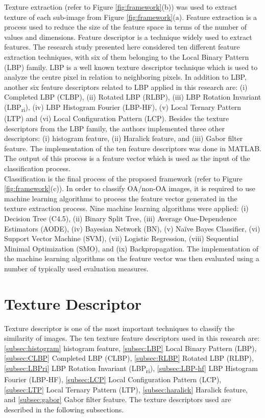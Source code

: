 \documentclass[review]{elsarticle}
\begin{document}
Texture extraction (refer to Figure \ref{fig:framework}(b)) was used to extract texture of each sub-image from Figure \ref{fig:framework}(a). Feature extraction is a process used to reduce the size of the feature space in terms of the number of values and dimensions. Feature descriptor is a technique widely used to extract features. The research study presented here considered ten different feature extraction techniques, with six of them belonging to the Local Binary Pattern (LBP) family. LBP is a well known texture descriptor technique which is used to analyze the centre pixel in relation to neighboring pixels. In addition to LBP, another six feature descriptors related to LBP applied in this research are: (i) Completed LBP (CLBP), (ii) Rotated LBP (RLBP), (iii) LBP Rotation Invariant (LBP\textsubscript{ri}), (iv) LBP Histogram Fourier (LBP-HF), (v) Local Ternary Pattern (LTP) and (vi) Local Configuration Pattern (LCP). Besides the texture descriptors from the LBP family, the authors implemented three other descriptors: (i) histogram feature, (ii) Haralick feature, and (iii) Gabor filter feature. The implementation of the ten feature descriptors was done in MATLAB. The output of this process is a feature vector which is used as the input of the classification process. \\

Classification is the final process of the proposed framework (refer to Figure \ref{fig:framework}(c)). In order to classify OA/non-OA images, it is required to use machine learning algorithms to process the feature vector generated in the texture extraction process. Nine machine learning algorithms were applied: (i) Decision Tree (C4.5), (ii) Binary Split Tree, (iii) Average One-Dependence Estimators (AODE), (iv) Bayesian Network (BN), (v) Na\"ive Bayes Classifier, (vi) Support Vector Machine (SVM), (vii) Logistic Regression, (viii) Sequential Minimal Optimization (SMO), and (ix) Backpropagation. The implementation of the machine learning algorithms on the feature vector was then evaluated using a number of typically used evaluation measures.

\section{Texture Descriptor}

Texture descriptor is one of the most important techniques to classify the similarity of images. The ten texture feature descriptors used in this research are: \ref{subsec:histogram} histogram feature, \ref{subsec:LBP} Local Binary Pattern (LBP), \ref{subsec:CLBP} Completed LBP (CLBP), \ref{subsec:RLBP} Rotated LBP (RLBP), \ref{subsec:LBPri} LBP Rotation Invariant (LBP\textsubscript{ri}), \ref{subsec:LBP-hf} LBP Histogram Fourier (LBP-HF),  \ref{subsec:LCP} Local Configuration Pattern (LCP), \ref{subsec:LTP} Local Ternary Pattern (LTP), \ref{subsec:haralick} Haralick feature, and \ref{subsec:gabor} Gabor filter feature. The texture descriptors used are described in the following subsections.
\end{document}
